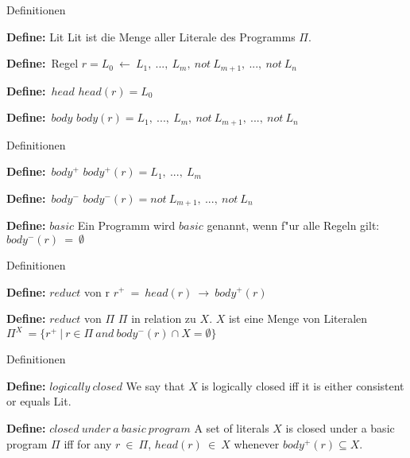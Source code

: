 \begin{frame}{Definitionen}
  \begin{block}{\textbf{Define:} Lit}
    Lit ist die Menge aller Literale des Programms $\Pi$.
  \end{block}
  \begin{block}{\textbf{Define:}~Regel}
    $r = L_0~\leftarrow~L_1,~...,~L_m,~not~L_{m+1},~...,~not~L_n$
  \end{block}
  \begin{block}{\textbf{Define:}~$head$}
    $head(r) = L_0$
  \end{block}
  \begin{block}{\textbf{Define:}~$body$}
    $body(r) = {L_1,~...,~L_m,~not~L_{m+1},~...,~not~L_n}$
  \end{block}
\end{frame}


\begin{frame}{Definitionen}
  \begin{block}{\textbf{Define:}~$body^+$}
    $body^+(r) = {L_1,~...,~L_m}$
  \end{block}
  \begin{block}{\textbf{Define:}~$body^-$}
    $body^-(r) = {not~L_{m+1},~...,~not~L_n}$
  \end{block}
  \begin{block}{\textbf{Define:} $basic$}
    Ein Programm wird $basic$ genannt, wenn f"ur alle Regeln gilt:\\
    $body^-(r)~=~\emptyset$
  \end{block}
\end{frame}


\begin{frame}{Definitionen}
  \begin{block}{\textbf{Define:} $reduct$ von r}
    $r^+~=~head(r)~\rightarrow~body^+(r)$
  \end{block}
  \begin{block}{\textbf{Define:} $reduct$ von $\Pi$}
    $\Pi$ in relation zu $X$. $X$ ist eine Menge von Literalen\\
    $\Pi^X~=\{r^+~|~r \in \Pi~and~body^-(r) \cap X = \emptyset \}$
  \end{block}
\end{frame}


\begin{frame}{Definitionen}
  \begin{block}{\textbf{Define:} $logically~closed$}
    We say that $X$ is logically closed iff it is either consistent or equals Lit.
  \end{block}
  \begin{block}{\textbf{Define:} $closed~under~a~basic~program$}
    A set of literals $X$ is closed under a basic program $\Pi$ iff for
    any $r~\in~\Pi$, $head(r)~\in~X$ whenever $body^+(r) \subseteq X$.
  \end{block}
\end{frame}



